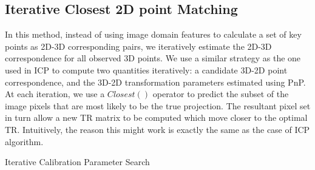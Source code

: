 \documentclass{article}
\begin{document}
\subsection{Iterative Closest 2D point Matching}
In this method, instead of using image domain features to calculate a set of key points as 2D-3D corresponding pairs, we iteratively estimate the 2D-3D correspondence for all observed 3D points. We use a similar strategy as the one used in ICP \cite{icp} to compute two quantities iteratively: a candidate 3D-2D point correspondence, and the 3D-2D transformation parameters estimated using PnP. At each iteration, we use a $Closest()$ operator to predict the subset of the image pixels that are most likely to be the true projection. The resultant pixel set in turn allow a new TR matrix to be computed which move closer to the optimal TR. Intuitively, the reason this might work is exactly the same as the case of ICP algorithm. 

\begin{algorithm}[!htbp]
	\caption{Iterative Calibration Parameter Search}
	\label{alg:model}

\end{algorithm}
\end{document}
